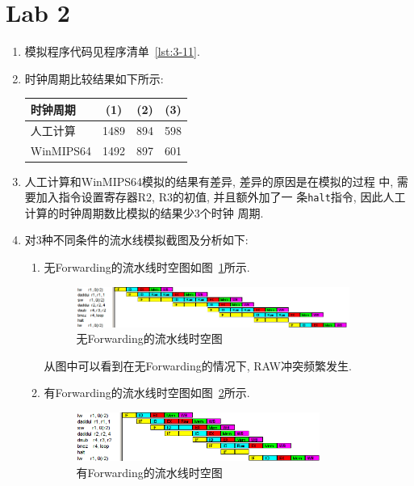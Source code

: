 \section{Lab 2}

\begin{solve}
  \begin{enumerate}
  \item 模拟程序代码见程序清单~\ref{lst:3-11}.

    
  \item 时钟周期比较结果如下所示:
    
      \begin{tabular}{lccc}
      \toprule
      时钟周期   & (1)  & (2) & (3) \\\midrule
      人工计算   & 1489 & 894 & 598 \\
      WinMIPS64 & 1492 & 897 & 601 \\\bottomrule
    \end{tabular}
    
  \item 人工计算和WinMIPS64模拟的结果有差异, 差异的原因是在模拟的过程
    中, 需要加入指令设置寄存器R2, R3的初值, 并且额外加了一
    条\texttt{halt}指令, 因此人工计算的时钟周期数比模拟的结果少3个时钟
    周期.
  \item 对3种不同条件的流水线模拟截图及分析如下:
    \begin{enumerate}
    \item 无Forwarding的流水线时空图如图~\ref{fig:3-11-1}所示. 
      
      \begin{figure}[!h]
        \centering
        \includegraphics[width=0.9\textwidth]{img/1.png}
        \caption{无Forwarding的流水线时空图}
        \label{fig:3-11-1}
      \end{figure}

      从图中可以看到在无Forwarding的情况下, RAW冲突频繁发生.
      
    \item 有Forwarding的流水线时空图如图~\ref{fig:3-11-2}所示. 
      
      \begin{figure}[!h]
        \centering
        \includegraphics[width=0.8\textwidth]{img/2.png}
        \caption{有Forwarding的流水线时空图}
        \label{fig:3-11-2}
      \end{figure}


\end{enumerate}
\end{enumerate}
\end{solve}

